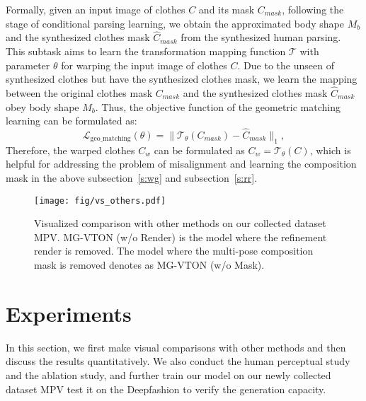 \documentclass[10pt,twocolumn,letterpaper]{article}
\begin{document}
Formally, given an input image of clothes $C$ and its mask $C_{mask}$, following the stage of conditional parsing learning, we obtain the approximated body shape $M_b$ and the synthesized clothes mask $\hat{C}_{mask}$ from the synthesized human parsing. This subtask aims to learn the transformation mapping function $\mathcal{T}$ with parameter $\theta$ for warping the input image of clothes $C$. Due to the unseen of synthesized clothes but have the synthesized clothes mask, we learn the mapping between the original clothes mask $C_{mask}$ and the synthesized clothes mask $\hat{C}_{mask}$ obey body shape $M_b$. Thus, the objective function of the geometric matching learning can be formulated as:
\begin{equation}
\mathcal{L}_{\text{geo\_matching}}(\theta) = \| \mathcal{T}_{\theta}(C_{mask}) -  \hat{C}_{mask}\|_1,
\label{eq:matching}
\end{equation}
Therefore, the warped clothes $C_{w}$ can be formulated as $C_{w} = \mathcal{T}_{\theta}(C)$, which is helpful for addressing the problem of misalignment and learning the composition mask in the above subsection~\ref{s:wg} and subsection~\ref{s:rr}.


\begin{figure*}[!tp]
\centering
\texttt{[image: fig/vs\_others.pdf]} 
\caption{Visualized comparison with other methods on our collected dataset MPV. MG-VTON (w/o Render) is the model where the refinement render is removed. The model where the multi-pose composition mask is removed denotes as MG-VTON (w/o Mask).}
\label{fig:vs_others}
\vspace{-4mm}
\end{figure*}


\section{Experiments}
In this section, we first make visual comparisons with other methods and then discuss the results quantitatively. We also conduct the human perceptual study and the ablation study, and further train our model on our newly collected dataset MPV test it on the Deepfashion to verify the generation capacity.
\end{document}
